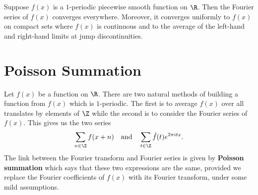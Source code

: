     \begin{theorem}\label{thm:Fourier_series_1_dimensional}
      Suppose \(f(x)\) is a \(1\)-periodic piecewise smooth function on \(\R\). Then the Fourier series of \(f(x)\) converges everywhere. Moreover, it converges uniformly to \(f(x)\) on compact sets where \(f(x)\) is continuous and to the average of the left-hand and right-hand limits at jump discontinuities. 
    \end{theorem}
  \section{Poisson Summation}\label{sec:Poisson_summation}
    Let \(f(x)\) be a function on \(\R\). There are two natural methods of building a function from \(f(x)\) which is \(1\)-periodic. The first is to average \(f(x)\) over all translates by elements of \(\Z\) while the second is to consider the Fourier series of \(f(x)\). This gives us the two series
    \[
      \sum_{n \in \Z}f(x+n) \quad \text{and} \quad \sum_{t \in \Z}\hat{f}(t)e^{2\pi itx}.
    \]
    The link between the Fourier transform and Fourier series is given by \textbf{Poisson summation} which says that these two expressions are the same, provided we replace the Fourier coefficients of \(f(x)\) with its Fourier transform, under some mild assumptions.

